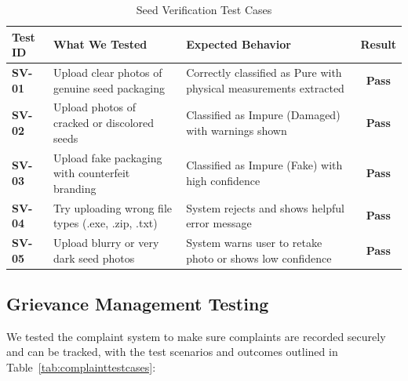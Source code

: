 \begin{table}[htbp]
  \centering
  \caption{Seed Verification Test Cases}
  \label{tab:seedtestcases}
  \renewcommand{\arraystretch}{1.35}
  \begin{tabularx}{\textwidth}{@{} l X X c @{}}
    \toprule
    \textbf{Test ID} & \textbf{What We Tested} & \textbf{Expected Behavior} & \textbf{Result} \\
    \midrule
    \textbf{SV-01} & Upload clear photos of genuine seed packaging & Correctly classified as Pure with physical measurements extracted & \textbf{Pass} \\
    \addlinespace
    \textbf{SV-02} & Upload photos of cracked or discolored seeds & Classified as Impure (Damaged) with warnings shown & \textbf{Pass} \\
    \addlinespace
    \textbf{SV-03} & Upload fake packaging with counterfeit branding & Classified as Impure (Fake) with high confidence & \textbf{Pass} \\
    \addlinespace
    \textbf{SV-04} & Try uploading wrong file types (.exe, .zip, .txt) & System rejects and shows helpful error message & \textbf{Pass} \\
    \addlinespace
    \textbf{SV-05} & Upload blurry or very dark seed photos & System warns user to retake photo or shows low confidence & \textbf{Pass} \\
    \bottomrule
  \end{tabularx}
\end{table}

\subsection{Grievance Management Testing}

We tested the complaint system to make sure complaints are recorded securely and can be tracked, with the test scenarios and outcomes outlined in Table~\ref{tab:complainttestcases}:

